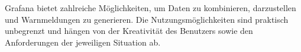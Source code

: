 Grafana bietet zahlreiche Möglichkeiten, um Daten zu kombinieren, darzustellen und Warnmeldungen zu generieren. Die Nutzungsmöglichkeiten sind praktisch unbegrenzt und hängen von der Kreativität des Benutzers sowie den Anforderungen der jeweiligen Situation ab.





